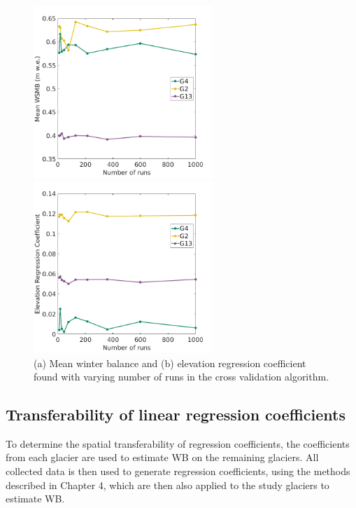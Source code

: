 \documentclass{sfuthesis}
\begin{document}
\begin{figure}[H]
\begin{minipage}[l][8cm][t]{.58\textwidth}
        \vspace*{\fill}
  \centering
  \includegraphics[height=6.5cm]{MLRrunWSMB.png}
  \subcaption{}
\end{minipage}%
\begin{minipage}[l][8cm][t]{.38\textwidth}
        \vspace*{\fill} 
          \centering
         \includegraphics[height=6.5cm]{MLRrunCoeffs.png}
  \subcaption{}
  \end{minipage}%

\caption{(a) Mean winter balance and (b) elevation regression coefficient found with varying number of runs in the cross validation algorithm. }
\label{fig:MLRruns}
\end{figure}



\subsection{Transferability of linear regression coefficients}
\label{sec:transferability}

To determine the spatial transferability of regression coefficients, the coefficients from each glacier are used to estimate WB on the remaining glaciers. All collected data is then used to generate regression coefficients, using the methods described in Chapter 4, which are then also applied to the study glaciers to estimate WB. 
\end{document}
